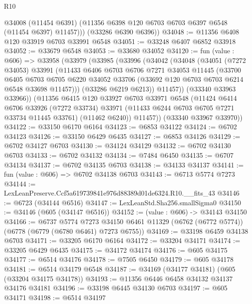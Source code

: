 \begin{lexlean}{R10}
\begin{coremodule}
          @34008
          (@11454 @6391)
          (@11356 @6398 @120 @6703 @6703 @6397 @6548 (@11454 @6397) @11457)))
      (@33286 @6390 @6396))
@34048 := @11356 @6408 @120 @33919 @6703 @33991 @6548
@34051 := @33248 @6407 @6852 @33918
@34052 := @33679 @6548
@34053 := @33680 @34052
@34120 := fun (value : @606) =>
  @33958
    (@33979
      (@33985
        (@33996
          (@34042
            (@34048
              (@34051
                (@7272 @34053)
                @33991
                (@11433
                  @6406
                  @6703
                  @6706
                  @7271
                  @34053
                  @11445
                  (@33700
                    @6405
                    @6703
                    @6705
                    @6220
                    @34052
                    @33706
                    (@33692 @120 @6703 @6703 @6214 @6548 @33698 @11457)))
                (@33286 @6219 @6213))
              @11457))
          (@33340 @33963 @33966))
        (@11356
          @6415
          @120
          @33927
          @6703
          @33971
          @6548
          (@11424
            @6414
            @6706
            @33926
            (@7272 @33734)
            @33971
            (@11433 @6244 @6703 @6705 @7271 @33734 @11445 @33761)
            (@11462 @6240))
          @11457))
      (@33340 @33967 @33970))
@34122 := @33150 @6170 @6164
@34123 := @6853 @34122
@34124 := @6702 @34123
@34126 := @33150 @6429 @6435
@34127 := @6853 @34126
@34129 := @6702 @34127 @6703
@34130 := @34124 @34129
@34132 := @6702 @34130 @6703
@34133 := @6702 @34132
@34134 := @7484 @6450
@34135 := @6707 @34134
@34137 := @6702 @34135 @6703
@34138 := @34133 @34137
@34141 := fun (value : @606) => @6702 @34138 @6703
@34143 := @6713 @5774 @7273
@34144 := LexLeanPreserve.Ccf5a619739841e976d88389d01de6324.R10.__fits_43
@34146 := @6723 (@34144 @6516)
@34147 := LexLeanStd.Sha256.smallSigma0
@34150 := @34146 (@605 (@34147 @6516))
@34152 := (value : @606) -> @34143 @34150
@34166 := @6737
    @5774
    @7273
    @34150
    @6461
    @11329
    (@6762 (@6772 @5774))
    (@6778 (@6779 (@6780 @6461) @7273 @6755))
@34169 := @33198 @6459 @34138 @6703
@34171 := @33205 @6170 @6164
@34172 := @33204 @34171
@34174 := @33205 @6429 @6435
@34175 := @34172 @34174
@34176 := @605 @34175
@34177 := @6514 @34176
@34178 := @7505 @6450
@34179 := @605 @34178
@34181 := @6514 @34179 @6548
@34187 := @34169 (@34177 @34181) (@605 (@33204 @34175 @34178))
@34193 := @11356 @6446 @6458 @34132 @34137 @34176 @34181
@34196 := @33198 @6445 @34130 @6703
@34197 := @605 @34171
@34198 := @6514 @34197

\end{coremodule}
\end{lexlean}
